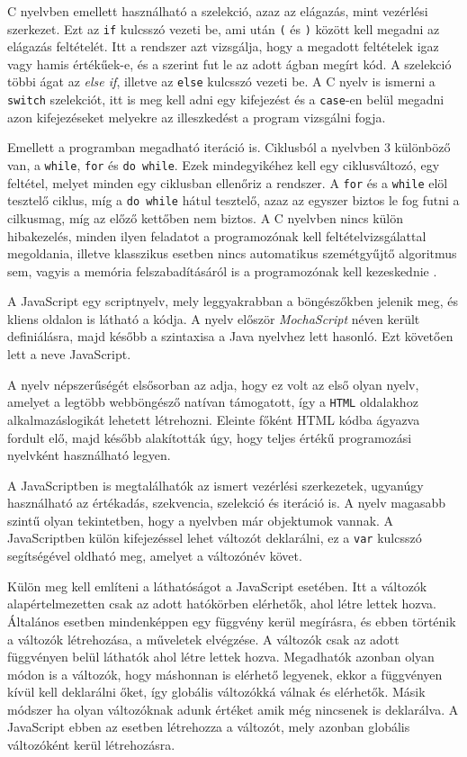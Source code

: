 C nyelvben emellett használható a szelekció, azaz az elágazás, mint vezérlési szerkezet.
Ezt az \texttt{if} kulcsszó vezeti be, ami után \texttt{(} és \texttt{)} között kell megadni az elágazás feltételét.
Itt a rendszer azt vizsgálja, hogy a megadott feltételek igaz vagy hamis értékűek-e, és a szerint fut le az adott ágban megírt kód. A szelekció többi ágat az \textit{else if}, illetve az \texttt{else} kulcsszó vezeti be.
A C nyelv is ismerni a \texttt{switch} szelekciót, itt is meg kell adni egy kifejezést és a \texttt{case}-en belül megadni azon kifejezéseket melyekre az illeszkedést a program vizsgálni fogja.

Emellett a programban megadható iteráció is. Ciklusból a nyelvben 3 különböző van, a \texttt{while}, \texttt{for} és \texttt{do while}. Ezek mindegyikéhez kell egy ciklusváltozó, egy feltétel, melyet minden egy ciklusban ellenőriz a rendszer. A \texttt{for} és a \texttt{while} elöl tesztelő ciklus, míg a \texttt{do while} hátul tesztelő, azaz az egyszer biztos le fog futni a cilkusmag, míg az előző kettőben nem biztos. A C nyelvben nincs külön hibakezelés, minden ilyen feladatot a programozónak kell feltételvizsgálattal megoldania, illetve klasszikus esetben nincs automatikus szemétgyűjtő algoritmus sem, vagyis a memória felszabadításáról is a programozónak kell kezeskednie \cite{c}.


A JavaScript egy scriptnyelv, mely leggyakrabban a böngészőkben jelenik meg, és kliens oldalon is látható a kódja. A nyelv először \textit{MochaScript} néven került definiálásra, majd később a szintaxisa a Java nyelvhez lett hasonló. Ezt követően lett a neve JavaScript.

A nyelv népszerűségét elsősorban az adja, hogy ez volt az első olyan nyelv, amelyet a legtöbb webböngésző natívan támogatott, így a \texttt{HTML} oldalakhoz alkalmazáslogikát lehetett létrehozni. Eleinte főként HTML kódba ágyazva fordult elő, majd később alakították úgy, hogy teljes értékű programozási nyelvként használható legyen.

A JavaScriptben is megtalálhatók az ismert vezérlési szerkezetek, ugyanúgy használható az értékadás, szekvencia, szelekció és iteráció is. A nyelv magasabb szintű olyan tekintetben, hogy a nyelvben már objektumok vannak. A JavaScriptben külön kifejezéssel lehet változót deklarálni, ez a \texttt{var} kulcsszó segítségével oldható meg, amelyet a változónév követ.

Külön meg kell említeni a láthatóságot a JavaScript esetében. Itt a változók alapértelmezetten csak az adott hatókörben elérhetők, ahol létre lettek hozva. Általános esetben mindenképpen egy függvény kerül megírásra, és ebben történik a változók létrehozása, a műveletek elvégzése. A változók csak az adott függvényen belül láthatók ahol létre lettek hozva. Megadhatók azonban olyan módon is a változók, hogy máshonnan is elérhető legyenek, ekkor a függvényen kívül kell deklarálni őket, így globális változókká válnak és elérhetők. Másik módszer ha olyan változóknak adunk értéket amik még nincsenek is deklarálva. A JavaScript ebben az esetben létrehozza a változót, mely azonban globális változóként kerül létrehozásra.

